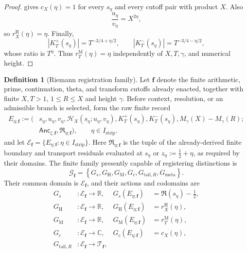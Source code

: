 \documentclass[11pt,a4paper]{article}
\theoremstyle{definition}
\newtheorem{definition}[theorem]{Definition}
\newcommand{\Residual}{\mathfrak{R}}
\begin{document}
\begin{proof}
 gives $c_X(\eta)=1$ for every $s_\eta$
and every cutoff pair with product $X$. Also
\[
  \frac{u_\eta}{v_\eta}=X^{2\eta},
\]
so $r_X^{\mathrm H}(\eta)=\eta$. Finally,
\[
  |K_T^+(s_\eta)|=T^{-3/4+\eta/2},
  \qquad
  |K_T^-(s_\eta)|=T^{-3/4-\eta/2},
\]
whose ratio is $T^\eta$. Thus $r_T^{\mathrm M}(\eta)=\eta$ independently of
$X,T,\gamma$, and numerical height.
\end{proof}

\begin{definition}[Riemann registration family]
\label{def:riemann-registration-family}
Let $\mathbf f$ denote the finite arithmetic, prime, continuation, theta, and
transform cutoffs already enacted, together with finite $X,T>1$,
$1\leq R\leq X$ and height $\gamma$. Before context, resolution, or an admissible branch is
selected, form the raw finite record
\[
\begin{aligned}
  E_{\eta;\mathbf f}
  :=
  \bigl(&s_\eta,u_\eta,v_\eta,
    \mathcal H_X(s_\eta;u_\eta,v_\eta),
    K_T^+(s_\eta),K_T^-(s_\eta),
    M_\gamma(X)-M_\gamma(R);\\
  &\mathsf{Anc}_{\zeta,\mathbf f},\Residual_{\eta;\mathbf f}\bigr),
  \qquad \eta\in I_{\mathrm{strip}}.
\end{aligned}
\]
and let
$\mathscr E_{\mathbf f}
=\{E_{\eta;\mathbf f}:\eta\in I_{\mathrm{strip}}\}$.
Here $\Residual_{\eta;\mathbf f}$ is the tuple of the already-derived finite
boundary and transport residuals evaluated at $s_\eta$ or
$z_\eta:=\tfrac12+\eta$, as required by their domains. The finite family
presently capable of registering distinctions is
\[
  \mathcal G_{\mathbf f}
  =
  \left\{
    G_s,G_{\mathrm H},G_{\mathrm M},G_c,G_{\mathrm{tail},R},G_{\mathrm{meta}}
  \right\}.
\]
Their common domain is $\mathscr E_{\mathbf f}$, and their actions and
codomains are
\[
  \begin{aligned}
  G_s &: \mathscr E_{\mathbf f}\to\mathbb R,
  &G_s(E_{\eta;\mathbf f})&=\Re(s_\eta)-\frac12,\\
  G_{\mathrm H}&:\mathscr E_{\mathbf f}\to\mathbb R,
  &G_{\mathrm H}(E_{\eta;\mathbf f})&=r_X^{\mathrm H}(\eta),\\
  G_{\mathrm M}&:\mathscr E_{\mathbf f}\to\mathbb R,
  &G_{\mathrm M}(E_{\eta;\mathbf f})&=r_T^{\mathrm M}(\eta),\\
  G_c&:\mathscr E_{\mathbf f}\to\mathbb C,
  &G_c(E_{\eta;\mathbf f})&=c_X(\eta),\\
  G_{\mathrm{tail},R}&:\mathscr E_{\mathbf f}\to\mathscr T_{\mathbf f},

\end{aligned}\]
\end{definition}
\end{document}
